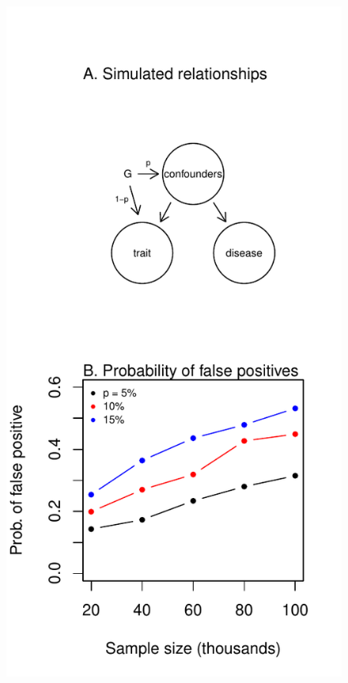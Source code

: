 \documentclass[11pt,titlepage]{article}
\begin{document}
 \clearpage
\begin{figure}
\begin{center}
\includegraphics[scale = 0.8]{ff.pdf}

\end{center}
\end{figure}
\end{document}
